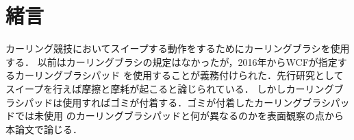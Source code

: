 \documentclass[main]{subfiles}
\begin{document}
\chapter{緒言}
カーリング競技においてスイープする動作をするためにカーリングブラシを使用する．
以前はカーリングブラシの規定はなかったが，2016年からWCFが指定するカーリングブラシパッド
を使用することが義務付けられた．先行研究としてスイープを行えば摩擦と摩耗が起こると論じられている．
しかしカーリングブラシパッドは使用すればゴミが付着する．ゴミが付着したカーリングブラシパッドでは未使用
のカーリングブラシパッドと何が異なるのかを表面観察の点から本論文で論じる． \cite{ref:mnih2013playing}
\end{document}
